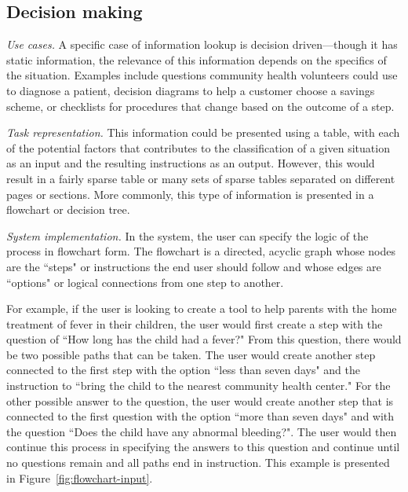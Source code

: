 \documentclass{sig-alternate}
\begin{document}
\subsection{Decision making}
\label{sec:decision}

\emph{Use cases.}
A specific case of information lookup is decision driven---though it has static information, the relevance of this information depends on the specifics of the situation. Examples include questions community health volunteers could use to diagnose a patient, decision diagrams to help a customer choose a savings scheme, or checklists for procedures that change based on the outcome of a step.

\emph{Task representation.}
This information could be presented using a table, with each of the potential factors that contributes to the classification of a given situation as an input and the resulting instructions as an output. However, this would result in a fairly sparse table or many sets of sparse tables separated on different pages or sections. More commonly, this type of information is presented in a flowchart or decision tree. 

\emph{System implementation.}
In the \nifty system, the user can specify the logic of the process in flowchart form. The flowchart is a directed, acyclic graph whose nodes are the ``steps" or instructions the end user should follow and whose edges are  ``options" or logical connections from one step to another.

For example, if the user is looking to create a tool to help parents with the home treatment of fever in their children, the user would first create a step with the question of ``How long has the child had a fever?" From this question, there would be two possible paths that can be taken. The user would create another step connected to the first step with the option ``less than seven days" and the instruction to ``bring the child to the nearest community health center." For the other possible answer to the question, the user would create another step that is connected to the first question with the option ``more than seven days" and with the question ``Does the child have any abnormal bleeding?". The user would then continue this process in specifying the answers to this question and continue until no questions remain and all paths end in instruction. This example is presented in Figure~\ref{fig:flowchart-input}.
\end{document}
